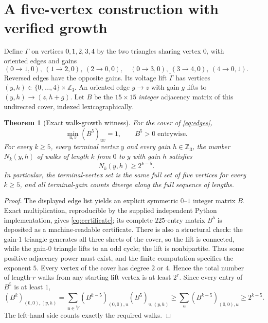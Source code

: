 \documentclass[11pt]{article}
\newtheorem{theorem}{Theorem}
\newcommand{\Z}{\mathbb Z}
\begin{document}
\section{A five-vertex construction with verified growth}
Define $\Gamma$ on vertices $0,1,2,3,4$ by the two triangles sharing vertex $0$, with oriented edges and gains
\begin{equation}
 (0\to1,0),\ (1\to2,0),\ (2\to0,0),\quad
 (0\to3,0),\ (3\to4,0),\ (4\to0,1).
 \label{eq:edges}
\end{equation}
Reversed edges have the opposite gains. Its voltage lift $\widetilde\Gamma$ has vertices $(y,h)\in\{0,\dots,4\}\times\Z_3$. An oriented edge $y\to z$ with gain $g$ lifts to $(y,h)\to(z,h+g)$. Let $B$ be the $15\times15$ \emph{integer} adjacency matrix of this undirected cover, indexed lexicographically.

\begin{theorem}[Exact walk-growth witness]\label{th:growth}
For the cover of \eqref{eq:edges},
\begin{equation}
 \min_{u,v}(B^5)_{uv}=1,\qquad B^5>0 \text{ entrywise}. \label{eq:certificate}
\end{equation}
For every $k\ge5$, every terminal vertex $y$ and every gain $h\in\Z_3$, the number $N_k(y,h)$ of walks of length $k$ from $0$ to $y$ with gain $h$ satisfies
\begin{equation}
 N_k(y,h)\ge 2^{k-5}. \label{eq:lower}
\end{equation}
In particular, the terminal-vertex set is the same full set of five vertices for every $k\ge5$, and all terminal-gain counts diverge along the full sequence of lengths.
\end{theorem}
\begin{proof}
The displayed edge list yields an explicit symmetric $0$--$1$ integer matrix $B$. Exact multiplication, reproducible by the supplied independent Python implementation, gives \eqref{eq:certificate}; its complete $225$-entry matrix $B^5$ is deposited as a machine-readable certificate. There is also a structural check: the gain-$1$ triangle generates all three sheets of the cover, so the lift is connected, while the gain-$0$ triangle lifts to an odd cycle; the lift is nonbipartite. Thus some positive adjacency power must exist, and the finite computation specifies the exponent $5$.
Every vertex of the cover has degree $2$ or $4$. Hence the total number of length-$r$ walks from any starting lift vertex is at least $2^r$. Since every entry of $B^5$ is at least $1$,
\[
 (B^k)_{(0,0),(y,h)}
 =\sum_{u\in\widetilde V}(B^{k-5})_{(0,0),u}(B^5)_{u,(y,h)}
 \ge \sum_u(B^{k-5})_{(0,0),u}\ge2^{k-5}.
\]
The left-hand side counts exactly the required walks.\qedhere
\end{proof}
\end{document}
